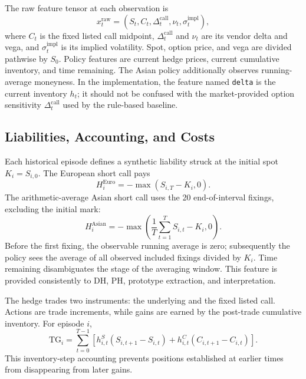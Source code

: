 \documentclass[conference]{IEEEtran}
\begin{document}
The raw feature tensor at each observation is
\begin{equation}
x_t^{\mathrm{raw}}=(S_t,C_t,\Delta_t^{\mathrm{call}},
\nu_t,\sigma_t^{\mathrm{impl}}),
\end{equation}
where $C_t$ is the fixed listed call midpoint, $\Delta_t^{\mathrm{call}}$ and
$\nu_t$ are its vendor delta and vega, and $\sigma_t^{\mathrm{impl}}$ is its
implied volatility. Spot, option price, and vega are divided pathwise by
$S_0$. Policy features are current hedge prices, current cumulative inventory,
and time remaining. The Asian policy additionally observes running-average
moneyness. In the implementation, the feature named \texttt{delta} is the
current inventory $h_t$; it should not be confused with the market-provided
option sensitivity $\Delta_t^{\mathrm{call}}$ used by the rule-based baseline.

\subsection{Liabilities, Accounting, and Costs}

Each historical episode defines a synthetic liability struck at the initial
spot $K_i=S_{i,0}$. The European short call pays
\begin{equation}
H_i^{\mathrm{Euro}}=-\max(S_{i,T}-K_i,0).
\end{equation}
The arithmetic-average Asian short call uses the 20 end-of-interval fixings,
excluding the initial mark:
\begin{equation}
H_i^{\mathrm{Asian}}=-\max\left(\frac{1}{T}
\sum_{t=1}^{T}S_{i,t}-K_i,0\right).
\end{equation}
Before the first fixing, the observable running average is zero; subsequently
the policy sees the average of all observed included fixings divided by $K_i$.
Time remaining disambiguates the stage of the averaging window. This feature is
provided consistently to DH, PH, prototype extraction, and interpretation.

The hedge trades two instruments: the underlying and the fixed listed call.
Actions are trade increments, while gains are earned by the post-trade
cumulative inventory. For episode $i$,
\begin{equation}
\mathrm{TG}_i=\sum_{t=0}^{T-1}\left[
h_{i,t}^{S}(S_{i,t+1}-S_{i,t})+
h_{i,t}^{C}(C_{i,t+1}-C_{i,t})\right].
\end{equation}
This inventory-step accounting prevents positions established at earlier times
from disappearing from later gains.
\end{document}
